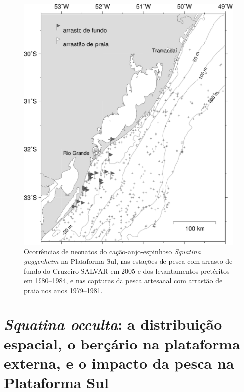 \documentclass[a4paper,11pt,twoside,showtrims,onecolumn,openright,final]{memoir}
\begin{document}
\begin{figure}
\begin{center}
\includegraphics[width=\textwidth]{Guggenheim_mapa_neonatos}
\end{center}
\caption[Ocorrências de neonatos do cação-anjo-espinhoso \emph{Squatina guggenheim} na Plataforma Sul]
	{Ocorrências de neonatos do cação-anjo-espinhoso \emph{Squatina guggenheim} na Plataforma Sul, 
	 nas estações de pesca com arrasto de fundo do Cruzeiro SALVAR em 2005 e 
	 dos levantamentos pretéritos em 1980--1984, e nas capturas da pesca artesanal 
	 com arrastão de praia nos anos 1979--1981.}
\label{fig:guggenheim-mapa-neonatos}
\end{figure}


\section*{\emph{Squatina occulta}: a distribuição espacial, o berçário na plataforma externa, 
          e o impacto da pesca na Plataforma Sul }

%
%
\end{document}
